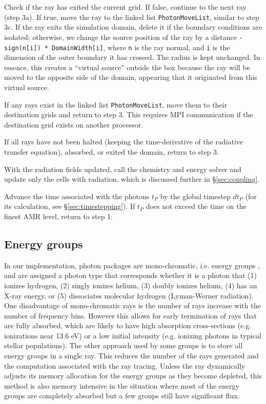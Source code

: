 \documentclass[apj,onecolumn]{emulateapj}
\begin{document}
 Check if the ray has exited the current grid.  If false,
continue to the next ray (step 3a).  If true, move the ray to the
linked list \texttt{PhotonMoveList}, similar to step 3c.  If the ray
exits the simulation domain, delete it if the boundary conditions are
isolated; otherwise, we change the source position of the ray by a
distance \texttt{-sign(n[i]) * DomainWidth[i]}, where \texttt{n} is
the ray normal, and \texttt{i} is the dimension of the outer boundary
it has crossed.  The radius is kept unchanged.  In essence, this
creates a ``virtual source'' outside the box because the ray will be
moved to the opposite side of the domain, appearing that it originated
from this virtual source.

 If any rays exist in the linked list \texttt{PhotonMoveList},
move them to their destination grids and return to step 3.  This
requires MPI communication if the destination grid exists on another
processor.

 If all rays have not been halted (keeping the time-derivative
of the radiative transfer equation), absorbed, or exited the domain,
return to step 3.

 With the radiation fields updated, call the chemistry and
energy solver and update only the cells with radiation, which is
discussed further in \S\ref{sec:coupling}.

 Advance the time associated with the photons $t_P$ by the
global timestep $dt_P$ (for its calculation, see
\S\ref{sec:timestepping}).  If $t_P$ does not exceed the time on the
finest AMR level, return to step 1.

\subsection{Energy groups}

In our implementation, photon packages are mono-chromatic, i.e. energy
groups \citep[][Ch. 6]{Mihalas84}, and are assigned a photon type that
corresponds whether it is a photon that (1) ionizes hydrogen, (2)
singly ionizes helium, (3) doubly ionizes helium, (4) has an X-ray
energy, or (5) dissociates molecular hydrogen (Lyman-Werner
radiation).  One disadvantage of mono-chromatic rays is the number of
rays increase with the number of frequency bins.  However this allows
for early termination of rays that are fully absorbed, which are
likely to have high absorption cross-sections (e.g. 
ionizations near 13.6 eV) or a low initial intensity (e.g. 
ionizing photons in typical stellar populations).  The other approach
used by some groups \citep[e.g.][]{Trac07} is to store all energy
groups in a single ray.  This reduces the number of the rays generated
and the computation associated with the ray tracing.  Unless the ray
dynamically adjusts its memory allocation for the energy groups as
they become depleted, this method is also memory intensive in the
situation where most of the energy groups are completely absorbed but
a few groups still have significant flux.
\end{document}
